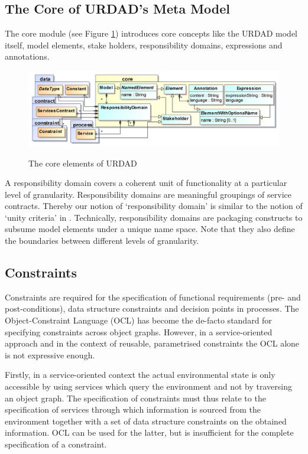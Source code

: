 \subsection{The Core of URDAD's Meta Model}

The core module (see Figure \ref{fig:coreModule}) introduces core concepts like the URDAD model itself, model elements, stake holders, responsibility domains, expressions and annotations.
\begin{figure}[thb]
  \centering
  \includegraphics{core}\\   
  \caption{The core elements of URDAD}
  \label{fig:coreModule}
\end{figure}


A responsibility domain covers a coherent unit of functionality at a particular level of granularity. Responsibility domains are meaningful groupings of service contracts. Thereby our notion of `responsibility domain' is similar to the notion of `unity criteria' in \cite{gonzalez_unity_2009}. Technically, responsibility domains are packaging constructs to subsume model elements under a unique name space. Note that they also define the boundaries between different levels of granularity. 

\subsection{Constraints}

Constraints are required for the specification of functional requirements (pre- and post-conditions), data structure constraints and decision points in processes. The Object-Constraint Language (OCL) has become the de-facto standard for specifying constraints across object graphs. However, in a service-oriented approach and in the context of reusable, parametrised constraints the OCL alone is not expressive enough. 

Firstly, in a service-oriented context the actual environmental state is only accessible by using services which query the environment and not by traversing an object graph. The specification of constraints must thus relate to the specification of services through which information is sourced from the environment together with a set of data structure constraints on the obtained information. OCL can be used for the latter, but is insufficient for the complete specification of a constraint.

